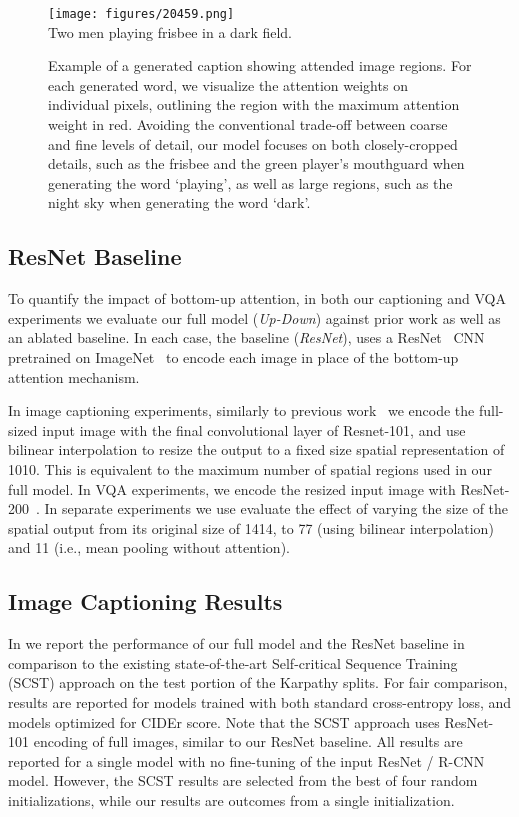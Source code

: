 \documentclass[10pt,twocolumn,letterpaper]{article}
\begin{document}
\begin{figure*}
	\begin{center}
		\texttt{[image: figures/20459.png]}\\
		Two men playing frisbee in a dark field.
	\end{center}
	\caption{Example of a generated caption showing attended image regions. For each generated word, we visualize the attention weights on individual pixels, outlining the region with the maximum attention weight in red. Avoiding the conventional trade-off between coarse and fine levels of detail, our model focuses on both closely-cropped details, such as the frisbee and the green player's mouthguard when generating the word `playing', as well as large regions, such as the night sky when generating the word `dark'.  }
	\label{fig:caption_example}
\end{figure*}

\subsection{ResNet Baseline}

To quantify the impact of bottom-up attention, in both our captioning and VQA experiments we evaluate our full model (\textit{Up-Down}) against prior work as well as an ablated baseline. In each case, the baseline (\textit{ResNet}), uses a ResNet~\cite{he2015deep} CNN pretrained on ImageNet~\cite{ILSVRC15} to encode each image in place of the bottom-up attention mechanism. 

In image captioning experiments, similarly to previous work~\cite{scst2016} we encode the full-sized input image with the final convolutional layer of Resnet-101, and use bilinear interpolation to resize the output to a fixed size spatial representation of 1010. This is equivalent to the maximum number of spatial regions used in our full model. In VQA experiments, we encode the resized input image with ResNet-200~\cite{he2016identityresnet}. In separate experiments we use evaluate the effect of varying the size of the spatial output from its original size of 1414, to 77 (using bilinear interpolation) and 11 (i.e., mean pooling without attention).



\subsection{Image Captioning Results}

In  we report the performance of our full model and the ResNet baseline in comparison to the existing state-of-the-art Self-critical Sequence Training~\cite{scst2016} (SCST) approach on the test portion of the Karpathy splits. For fair comparison, results are reported for models trained with both standard cross-entropy loss, and models optimized for CIDEr score. Note that the SCST approach uses ResNet-101 encoding of full images, similar to our ResNet baseline. All results are reported for a single model with no fine-tuning of the input ResNet / R-CNN model. However, the SCST results are selected from the best of four random initializations, while our results are outcomes from a single initialization.
\end{document}
